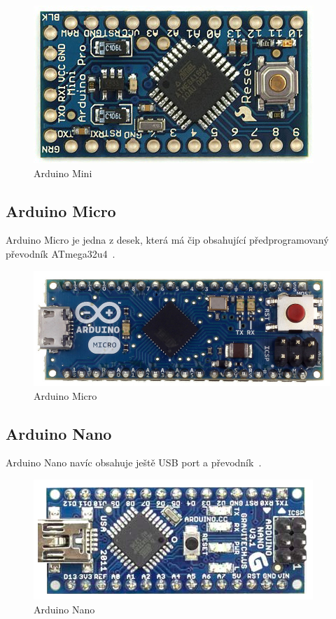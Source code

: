 			\begin{figure}[!h]
  \begin{center}
    \includegraphics[scale=0.3]{obrazky/emded_arduino_mini}
  \end{center}
  \caption{Arduino Mini~\cite{ArduinoMini}}
\end{figure}
	
	\subsection{Arduino Micro} 
	Arduino Micro je jedna z desek, která má čip obsahující předprogramovaný převodník ATmega32u4~\cite{ArduinoMicro}.	 
	
		\begin{figure}[!h]
  \begin{center}
    \includegraphics[scale=0.2]{obrazky/emded_arduino_micro}
  \end{center}
  \caption{Arduino Micro~\cite{ArduinoMicro}}
\end{figure}
	
	\subsection{Arduino Nano} 
	Arduino Nano navíc obsahuje ještě USB port a převodník~\cite{ArduinoNano}.	
	
	\begin{figure}[!h]
  \begin{center}
    \includegraphics[scale=0.5]{obrazky/emded_arduino_nano}
  \end{center}
  \caption{Arduino Nano~\cite{ArduinoNano}}
\end{figure}
	
